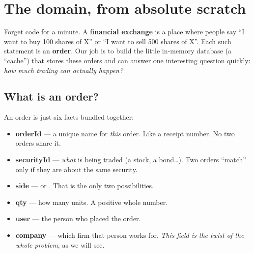 \section{The domain, from absolute scratch}

Forget code for a minute. A \textbf{financial exchange} is a place where people
say ``I want to buy 100 shares of X'' or ``I want to sell 500 shares of X''.
Each such statement is an \textbf{order}. Our job is to build the little
in-memory database (a ``cache'') that stores these orders and can answer one
interesting question quickly: \emph{how much trading can actually happen?}

\subsection{What is an order?}

An order is just six facts bundled together:

\begin{center}
\end{center}

\begin{itemize}[leftmargin=1.4em]
  \item \textbf{orderId} --- a unique name for \emph{this} order. Like a receipt number. No two orders share it.
  \item \textbf{securityId} --- \emph{what} is being traded (a stock, a bond\dots). Two orders ``match'' only if they are about the same security.
  \item \textbf{side} --- \Buy{} or \Sell. That is the only two possibilities.
  \item \textbf{qty} --- how many units. A positive whole number.
  \item \textbf{user} --- the person who placed the order.
  \item \textbf{company} --- which firm that person works for. \emph{This field is the twist of the whole problem}, as we will see.
\end{itemize}


